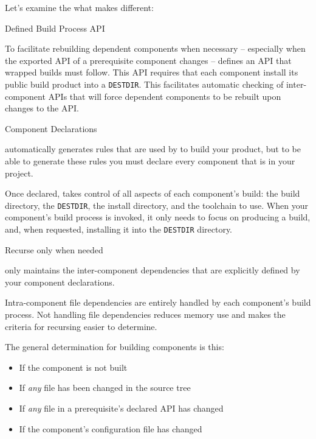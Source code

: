 Let's examine the what makes \lmsbw different:

\begin{description}
\item Defined Build Process API

  To facilitate rebuilding dependent components when necessary --
  especially when the exported API of a prerequisite component changes
  -- \lmsbw defines an API that wrapped builds must follow.  This API
  requires that each component install its public build product into a
  \texttt{DESTDIR}.  This facilitates automatic checking of
  inter-component APIs that will force dependent components to be
  rebuilt upon changes to the API.

\item Component Declarations

  \lmsbw automatically generates rules that are used by \make to build
  your product, but to be able to generate these rules you must
  declare every component that is in your project.

  Once declared, \lmsbw takes control of all aspects of each
  component's build: the build directory, the \texttt{DESTDIR}, the
  install directory, and the toolchain to use.  When your component's
  build process is invoked, it only needs to focus on producing a
  build, and, when requested, installing it into the \texttt{DESTDIR}
  directory.

\item Recurse only when needed\label{intro:build-component-criteria}

  \lmsbw only maintains the inter-component dependencies that are
  explicitly defined by your component declarations.

  Intra-component file dependencies are entirely handled by each
  component's build process.  Not handling file dependencies reduces
  memory use and makes the criteria for recursing easier to determine.

  The general determination for building components is this:

  \begin{itemize}
  \item If the component is not built
  \item If \emph{any} file has been changed in the source tree
  \item If \emph{any} file in a prerequisite's declared API has
    changed
  \item If the component's configuration file has changed
  \end{itemize}


\end{description}
